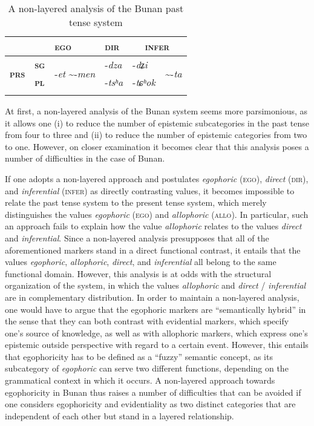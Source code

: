 \documentclass[output=paper]{langsci/langscibook}
\begin{document}
\begin{table}
\begin{tabularx}{.66\textwidth}{lX l X ll}
\lsptoprule
	&		&	\textbf{\textsc{ego}}	&	\textbf{\textsc{dir}}	&	\multicolumn{2}{c}{\textbf{\textsc{infer}}}			\\
\midrule
\multirow{2}{*}{\textbf{\textsc{prs}}}	&	\textbf{\textsc{sg}}	&	\multirow{2}{*}{-\textit{et} \sim -\textit{men}}	&	-\textit{dza}	&	-\textit{dʑi}	&	\multirow{2}{*}{\sim -\textit{ta}}	\\
	&	\textbf{\textsc{pl}}	&		&	-\textit{tsʰa}	&	-\textit{tɕʰok}	&		\\
\lspbottomrule
\end{tabularx}
\caption{A non-layered analysis of the Bunan past tense system}
\label{tab:mw9}
\end{table}

At first, a non-layered analysis of the Bunan system seems more parsimonious, as it allows one (i) to reduce the number of epistemic subcategories in the past tense from four to three and (ii) to reduce the number of epistemic categories from two to one. However, on closer examination it becomes clear that this analysis poses a number of difficulties in the case of Bunan.

If one adopts a non-layered approach and postulates \emph{egophoric} (\textsc{ego}), \emph{direct} (\textsc{dir}), and \emph{inferential} (\textsc{infer}) as directly contrasting values, it becomes impossible to relate the past tense system to the present tense system, which merely distinguishes the values \emph{egophoric} (\textsc{ego}) and \emph{allophoric} (\textsc{allo}). In particular, such an approach fails to explain how the value \textit{allophoric} relates to the values \textit{direct} and \textit{inferential}. Since a non-layered analysis presupposes that all of the aforementioned markers stand in a direct functional contrast, it entails that the values \textit{egophoric}, \textit{allophoric}, \textit{direct}, and \textit{inferential} all belong to the same functional domain. However, this analysis is at odds with the structural organization of the system, in which the values \textit{allophoric} and \textit{direct} / \textit{inferential} are in complementary distribution. In order to maintain a non-layered analysis, one would have to argue that the egophoric markers are “semantically hybrid” in the sense that they can both contrast with evidential markers, which specify one’s source of knowledge, as well as with allophoric markers, which express one’s epistemic outside perspective with regard to a certain event. However, this entails that egophoricity has to be defined as a “fuzzy” semantic concept, as its subcategory of \textit{egophoric} can serve two different functions, depending on the grammatical context in which it occurs. A non-layered approach towards egophoricity in Bunan thus raises a number of difficulties that can be avoided if one considers egophoricity and evidentiality as two distinct categories that are independent of each other but stand in a layered relationship.
\end{document}
